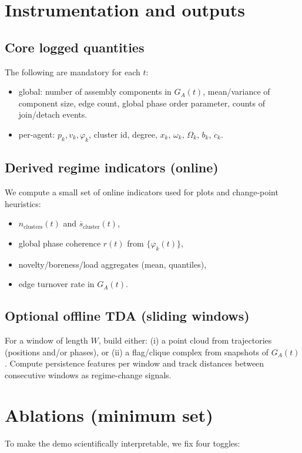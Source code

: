 \documentclass[11pt]{article}
\newcommand{\varph}{\varphi}
\begin{document}
\section{Instrumentation and outputs}
\subsection{Core logged quantities}
The following are mandatory for each $t$:
\begin{itemize}[leftmargin=2.2em]
\item global: number of assembly components in $G_A(t)$, mean/variance of component size, edge count,
global phase order parameter, counts of join/detach events.
\item per-agent: $p_k,v_k,\varph_k$, cluster id, degree, $x_k$, $\omega_k$, $\Omega_k$, $b_k$, $c_k$.
\end{itemize}

\subsection{Derived regime indicators (online)}
We compute a small set of online indicators used for plots and change-point heuristics:
\begin{itemize}[leftmargin=2.2em]
\item $n_{\text{clusters}}(t)$ and $\overline{s}_{\text{cluster}}(t)$,
\item global phase coherence $r(t)$ from $\{\varph_k(t)\}$,
\item novelty/boreness/load aggregates (mean, quantiles),
\item edge turnover rate in $G_A(t)$.
\end{itemize}

\subsection{Optional offline TDA (sliding windows)}
For a window of length $W$, build either:
(i) a point cloud from trajectories (positions and/or phases), or
(ii) a flag/clique complex from snapshots of $G_A(t)$.
Compute persistence features per window and track distances between consecutive windows as regime-change signals.

\section{Ablations (minimum set)}
To make the demo scientifically interpretable, we fix four toggles:
\end{document}
